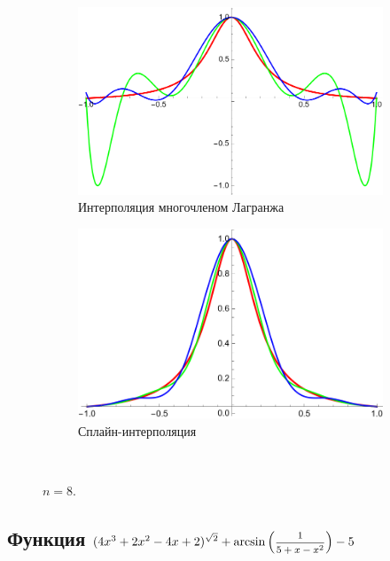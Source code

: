 \documentclass[12pt, a4paper]{article}
\begin{document}
	\begin{figure}[H]
		\centering
		\begin{subfigure}{0.4\textwidth}
			\includegraphics[width=\textwidth]{5_l8}
			\caption{Интерполяция многочленом Лагранжа}
		\end{subfigure}
		\hfill
		\begin{subfigure}{0.4\textwidth}
			\includegraphics[width=\textwidth]{5_s8}
			\caption{Сплайн-интерполяция}
		\end{subfigure}
		\hfill
		\\[0.5cm]
		\caption{$n=8$.}
	\end{figure}
	
	\subsection{Функция $(4 x^3+2 x^2-4x+2)^{\sqrt 2} +\arcsin{\left(\hbox{\footnotesize$\displaystyle\frac{1}{5+x-x^2}$}\right)}-5$}
	
\end{document}
